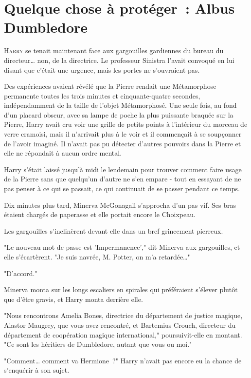\chapter{Quelque chose à protéger~: Albus Dumbledore}

\lettrine{H}{arry} se tenait maintenant face aux gargouilles gardiennes du bureau du directeur… non, de la directrice. Le professeur Sinistra l'avait convoqué en lui disant que c'était une urgence, mais les portes ne s'ouvraient pas.

Des expériences avaient révélé que la Pierre rendait une Métamorphose permanente toutes les trois minutes et cinquante-quatre secondes, indépendamment de la taille de l'objet Métamorphosé. Une seule fois, au fond d'un placard obscur, avec sa lampe de poche la plus puissante braquée sur la Pierre, Harry avait cru voir une grille de petits points à l'intérieur du morceau de verre cramoisi, mais il n'arrivait plus à le voir et il commençait à se soupçonner de l'avoir imaginé. Il n'avait pas pu détecter d'autres pouvoirs dans la Pierre et elle ne répondait à aucun ordre mental.

Harry s'était laissé jusqu'à midi le lendemain pour trouver comment faire usage de la Pierre sans que quelqu'un d'autre ne s'en empare - tout en essayant de ne pas penser à ce qui se passait, ce qui continuait de se passer pendant ce temps.

Dix minutes plus tard, Minerva McGonagall s'approcha d'un pas vif. Ses bras étaient chargés de paperasse et elle portait encore le Choixpeau.

Les gargouilles s'inclinèrent devant elle dans un bref grincement pierreux.

"Le nouveau mot de passe est 'Impermanence'," dit Minerva aux gargouilles, et elle s'écartèrent. "Je suis navrée, M. Potter, on m'a retardée…"

"D'accord."

Minerva monta sur les longs escaliers en spirales qui préféraient s'élever plutôt que d'être gravis, et Harry monta derrière elle.

"Nous rencontrons Amelia Bones, directrice du département de justice magique, Alastor Maugrey, que vous avez rencontré, et Bartemius Crouch, directeur du département de coopération magique international," poursuivit-elle en montant. "Ce sont les héritiers de Dumbledore, autant que vous ou moi."

"Comment… comment va Hermione~?" Harry n'avait pas encore eu la chance de s'enquérir à son sujet.

